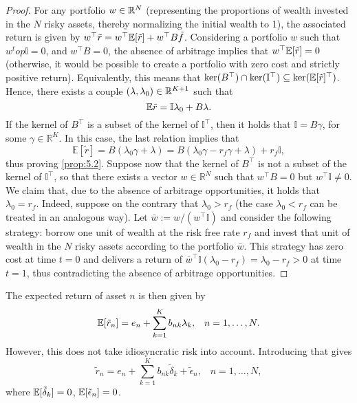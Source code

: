 \documentclass[twoside, titlepage]{article}
\begin{document}
\begin{proof}
    For any portfolio $w \in \mathbb{R}^N$ (representing the proportions of wealth invested in the $N$ risky assets, thereby normalizing the initial wealth to 1), the associated return is given by $w^\top \tilde{r} = w^\top \mathbb{E}[\tilde{r}] + w^\top B \tilde{f}$. Considering a portfolio $w$ such that $w^top \mathbb{I} = 0$, and $w^\top B = 0$, the absence of arbitrage implies that $w^\top \mathbb{E}[\tilde{r}] = 0$ (otherwise, it would be possible to create a portfolio with zero cost and strictly positive return). Equivalently, this means that $\ker(B^\top) \cap \ker(\mathbb{I}^\top) \subseteq \ker(\mathbb{E}[\tilde{r}]^\top)$. Hence, there exists a couple $(\lambda, \lambda_0) \in \mathbb{R}^{K+1}$ such that
    \[
        \mathbb{E}\tilde{r} = \mathbb{I}\lambda_0 + B\lambda.
    \]
    If the kernel of $B^{\top}$ is a subset of the kernel of $\mathbb{I}^{\top}$, then it holds that $\mathbb{I}=B \gamma$, for some $\gamma \in \mathbb{R}^K$. In this case, the last relation implies that
    \[
        \mathbb{E}[\tilde{r}]=B\left(\lambda_0 \gamma+\lambda\right)=B\left(\lambda_0 \gamma-r_f \gamma+\lambda\right)+r_f \mathbb{I},
    \]
    thus proving \cref{prop:5.2}. Suppose now that the kernel of $B^{\top}$ is not a subset of the kernel of $\mathbb{I}^{\top}$, so that there exists a vector $w \in \mathbb{R}^N$ such that $w^{\top} B=0$ but $w^{\top} \mathbb{I} \neq 0$. We claim that, due to the absence of arbitrage opportunities, it holds that $\lambda_0=r_f$. Indeed, suppose on the contrary that $\lambda_0>r_f$ (the case $\lambda_0<r_f$ can be treated in an analogous way). Let $\bar{w}:=w /\left(w^{\top} \mathbb{I}\right)$ and consider the following strategy: borrow one unit of wealth at the risk free rate $r_f$ and invest that unit of wealth in the $N$ risky assets according to the portfolio $\bar{w}$. This strategy has zero cost at time $t=0$ and delivers a return of $\bar{w}^{\top} \mathbb{I}\left(\lambda_0-r_f\right)=\lambda_0-r_f>0$ at time $t=1$, thus contradicting the absence of arbitrage opportunities.
\end{proof}

The expected return of asset $n$ is then given by
\[
    \mathbb{E}[\tilde{r}_n] = e_n + \sum_{k=1}^{K} b_{nk} \lambda_k, \;\;\; n = 1, \dots, N.
\]
However, this does not take idiosyncratic risk into account. Introducing that gives
\[
    \tilde{r}_n = e_n + \sum_{k=1}^{K} b_{nk} \tilde{\delta}_k + \tilde{\epsilon}_n, \;\;\; n = 1, \dots, N,
\]
where $\mathbb{E}[\tilde{\delta}_k] = 0$, $\mathbb{E}[\tilde{\epsilon}_n] = 0$.
\end{document}
